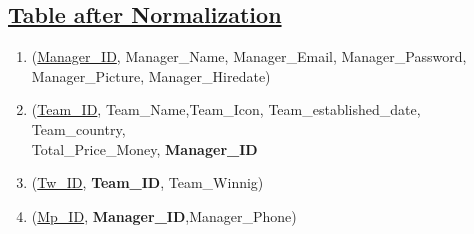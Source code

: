 \subsection*{\underline{Table after Normalization}}
\begin{enumerate}
    \item (\underline{Manager\_ID}, Manager\_Name, Manager\_Email, Manager\_Password,\\Manager\_Picture, Manager\_Hiredate)
    \item (\underline{Team\_ID}, Team\_Name,Team\_Icon, Team\_established\_date, Team\_country,\\Total\_Price\_Money, \textbf{Manager\_ID}
    \item (\underline{Tw\_ID}, \textbf{Team\_ID}, Team\_Winnig)
    \item (\underline{Mp\_ID}, \textbf{Manager\_ID},{Manager\_Phone})
\end{enumerate}
\clearpage